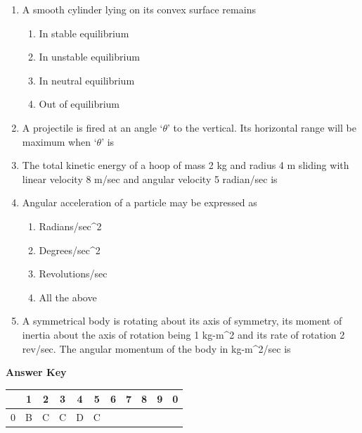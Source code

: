 \documentclass[11pt,a4paper]{article}
\begin{document}
\begin{enumerate}
\item{A smooth cylinder lying on its convex surface remains}
\begin{enumerate}[label=\Alph*.]
\item{In stable equilibrium}
\item{In unstable equilibrium}
\item{In neutral equilibrium}
\item{Out of equilibrium}
\end{enumerate}
\item{A projectile is fired at an angle `$\theta$' to the vertical. Its horizontal range will be maximum when `$\theta$' is
}
\\
\item{The total kinetic energy of a hoop of mass 2 kg and radius 4 m sliding with linear velocity 8 m/sec and angular velocity 5 radian/sec is}
\\
\item{Angular acceleration of a particle may be expressed as}
\begin{enumerate}[label=\Alph*.]
\item{Radians/sec\^{}2}
\item{Degrees/sec\^{}2}
\item{Revolutions/sec}
\item{All the above}
\end{enumerate}
\item{A symmetrical body is rotating about its axis of symmetry, its moment of inertia about the axis of rotation being 1 kg-m\^{}2 and its rate of rotation 2 rev/sec. The angular momentum of the body in kg-m\^{}2/sec is}
\\
\end{enumerate}
\textbf{Answer Key}
\begin{tabular}{ | c | c c c c c c c c c c | }
\hline
 & 1 & 2 & 3 & 4 & 5 & 6 & 7 & 8 & 9 & 0 \\
\hline
0 & B & C & C & D & C &   &   &   &   &   \\
\hline
\end{tabular}
\clearpage
\end{document}
